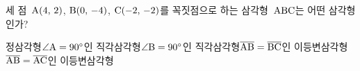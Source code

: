 세 점~$\mathrm{A}(4,\,2)$, $\mathrm{B}(0,\,-4)$, $\mathrm{C}(-2,\,-2)$를 꼭짓점으로 하는 삼각형~$\mathrm{ABC}$는 어떤 삼각형인가?
\begin{choicesii}{정삼각형}{$\angle\mathrm{A}=90^\circ$인 직각삼각형}{$\angle\mathrm{B}=90^\circ$인 직각삼각형}{$\overline{\mathrm{AB}}=\overline{\mathrm{BC}}$인 이등변삼각형}{$\overline{\mathrm{AB}}=\overline{\mathrm{AC}}$인 이등변삼각형}\end{choicesii}
